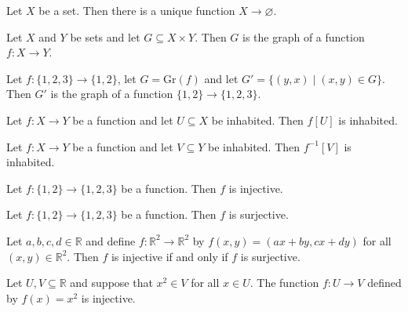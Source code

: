 \begin{chapex} %
Let $X$ be a set. Then there is a unique function $X \to \varnothing$.
\end{chapex}

\begin{chapex} %
Let $X$ and $Y$ be sets and let $G \subseteq X \times Y$. Then $G$ is the graph of a function $f : X \to Y$.
\end{chapex}

\begin{chapex} %
Let $f : \{ 1, 2, 3 \} \to \{ 1, 2 \}$, let $G = \mathrm{Gr}(f)$ and let $G' = \{ (y,x) \mid (x,y) \in G \}$. Then $G'$ is the graph of a function $\{ 1, 2 \} \to \{ 1, 2, 3 \}$.
\end{chapex}

\begin{chapex} %
Let $f : X \to Y$ be a function and let $U \subseteq X$ be inhabited. Then $f[U]$ is inhabited.
\end{chapex}

\begin{chapex} %
Let $f : X \to Y$ be a function and let $V \subseteq Y$ be inhabited. Then $f^{-1}[V]$ is inhabited.
\end{chapex}

\begin{chapex} %
Let $f : \{ 1, 2 \} \to \{ 1, 2, 3 \}$ be a function. Then $f$ is injective.
\end{chapex}

\begin{chapex} %
Let $f : \{ 1, 2 \} \to \{ 1, 2, 3 \}$ be a function. Then $f$ is surjective.
\end{chapex}

\begin{chapex} %
Let $a,b,c,d \in \mathbb{R}$ and define $f : \mathbb{R}^2 \to \mathbb{R}^2$ by $f(x,y) = (ax+by,cx+dy)$ for all $(x,y) \in \mathbb{R}^2$. Then $f$ is injective if and only if $f$ is surjective.
\end{chapex}

\begin{chapex} %
\label{cqFunctionsASNEnd}
Let $U, V \subseteq \mathbb{R}$ and suppose that $x^2 \in V$ for all $x \in U$. The function $f : U \to V$ defined by $f(x) = x^2$ is injective.
\end{chapex}